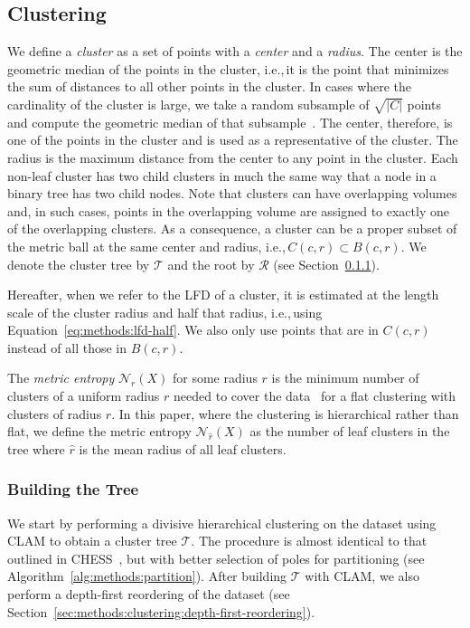 \subsection{Clustering}
\label{sec:methods:clustering}

We define a \textit{cluster} as a set of points with a \textit{center} and a \textit{radius}.
The center is the geometric median of the points in the cluster, i.e.,\,it is the point that minimizes the sum of distances to all other points in the cluster.
In cases where the cardinality of the cluster is large, we take a random subsample of $\sqrt{|C|}$ points and compute the geometric median of that subsample~\cite{ishaq2019clustered}.
The center, therefore, is one of the points in the cluster and is used as a representative of the cluster.
The radius is the maximum distance from the center to any point in the cluster.
Each non-leaf cluster has two child clusters in much the same way that a node in a binary tree has two child nodes.
Note that clusters can have overlapping volumes and, in such cases, points in the overlapping volume are assigned to exactly one of the overlapping clusters.
As a consequence, a cluster can be a proper subset of the metric ball at the same center and radius, i.e.,\,$C(c, r) \subset B(c, r)$. We denote the cluster tree by $\mathcal{T}$ and the root by $\mathcal{R}$ (see Section~\ref{sec:methods:clustering:building-the-tree}).

Hereafter, when we refer to the LFD of a cluster, it is estimated at the length scale of the cluster radius and half that radius, i.e.,\,using Equation~\ref{eq:methods:lfd-half}.
We also only use points that are in $C(c, r)$ instead of all those in $B(c, r)$.

The \textit{metric entropy} $\mathcal{N}_{r}(X)$ for some radius $r$ is the minimum number of clusters of a uniform radius $r$ needed to cover the data~\cite{yu2015entropy} for a flat clustering with clusters of radius $r$.
In this paper, where the clustering is hierarchical rather than flat, we define the metric entropy $\mathcal{N}_{\hat{r}}(X)$ as the number of leaf clusters in the tree where $\hat{r}$ is the mean radius of all leaf clusters.


\subsubsection{Building the Tree}
\label{sec:methods:clustering:building-the-tree}

We start by performing a divisive hierarchical clustering on the dataset using CLAM to obtain a cluster tree $\mathcal{T}$.
The procedure is almost identical to that outlined in CHESS~\cite{ishaq2019clustered}, but with better selection of poles for partitioning (see Algorithm~\ref{alg:methods:partition}).
After building $\mathcal{T}$ with CLAM, we also perform a depth-first reordering of the dataset (see Section~\ref{sec:methods:clustering:depth-first-reordering}).

